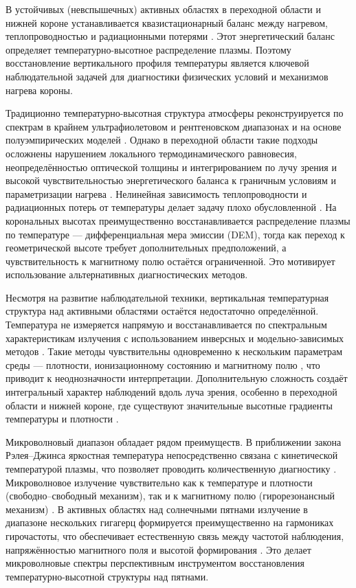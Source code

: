 \documentclass[
 aps, pra,
 amsmath,amssymb,
 11pt,
 final,
tightenlines,
 twoside,
 twocolumn,
 nofloats,
nofootinbib,
 superscriptaddress,
showkeys,
showkeywords,
 ]
{revtex4-2}
\newcommand{\as}[1]{{\color{blue} #1}}
\begin{document}
В устойчивых (невспышечных) активных областях в переходной области и нижней короне устанавливается квазистационарный баланс между нагревом, теплопроводностью и радиационными потерями \citep{Aschwanden2005}. Этот энергетический баланс определяет температурно-высотное распределение плазмы. Поэтому восстановление вертикального профиля температуры является ключевой наблюдательной задачей для диагностики физических условий и механизмов нагрева короны.


Традиционно температурно-высотная структура атмосферы реконструируется по спектрам в крайнем ультрафиолетовом и рентгеновском диапазонах и на основе полуэмпирических моделей \citep{Vernazza1981,Maltby1986,Fontenla2009}. Однако в переходной области такие подходы осложнены нарушением локального термодинамического равновесия, неопределённостью оптической толщины и интегрированием по лучу зрения и высокой чувствительностью энергетического баланса к граничным условиям и параметризации нагрева \citep{Aschwanden2005}. Нелинейная зависимость теплопроводности и радиационных потерь от температуры делает задачу плохо обусловленной \citep{Spitzer1962}. На корональных высотах преимущественно восстанавливается распределение плазмы по температуре  ---  дифференциальная мера
эмиссии (DEM), 
тогда как переход к геометрической высоте требует дополнительных предположений, а чувствительность к магнитному полю остаётся ограниченной. Это мотивирует использование альтернативных диагностических методов.

Несмотря на развитие наблюдательной техники, вертикальная температурная структура над активными областями остаётся недостаточно определённой. Температура не измеряется напрямую и восстанавливается по спектральным характеристикам излучения с использованием инверсных и модельно-зависимых методов \citep{HannahKontar2012,Cheung2015}. Такие методы чувствительны одновременно к нескольким параметрам среды --- плотности, ионизационному состоянию и магнитному полю \citep{Zanna2018,Reale2014}, что приводит к неоднозначности интерпретации. Дополнительную сложность создаёт интегральный характер наблюдений вдоль луча зрения, особенно в переходной области и нижней короне, где существуют значительные высотные градиенты температуры и плотности \citep{Judge2010,Slemzin2014,Antonucci2020}.

Микроволновый диапазон обладает рядом преимуществ. В приближении закона Рэлея–Джинса яркостная температура непосредственно связана с кинетической температурой плазмы, что позволяет проводить количественную диагностику \citep{Dulk1985,Gary2004,Lee2007,Shibasaki2011}. Микроволновое излучение чувствительно как к температуре и плотности (свободно–свободный механизм), так и к магнитному полю (гирорезонансный механизм) \citep{Dulk1985,Shibasaki2011,Nindos2020}. В активных областях \as{над солнечными пятнами}  излучение в диапазоне нескольких гигагерц формируется преимущественно на гармониках гирочастоты, что обеспечивает естественную связь между частотой наблюдения, напряжённостью магнитного поля и высотой формирования \citep{1968SvA....12..245Z,1968SvA....12..464Z,1979SvA....23..316G,1980A&A....82...30A,1996ASSL..204.....Z}. Это делает микроволновые спектры перспективным инструментом восстановления температурно-высотной структуры над пятнами.
\end{document}
